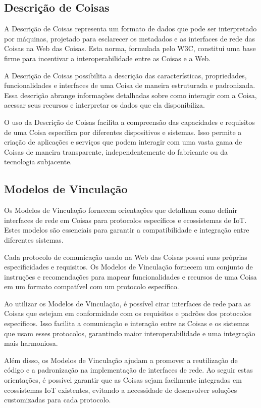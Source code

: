 \subsection{Descrição de Coisas}

A Descrição de Coisas representa um formato de dados que pode ser interpretado por máquinas, projetado para esclarecer os metadados e as interfaces de rede das Coisas na Web das Coisas. Esta norma, formulada pelo W3C, constitui uma base firme para incentivar a interoperabilidade entre as Coisas e a Web.

A Descrição de Coisas possibilita a descrição das características, propriedades, funcionalidades e interfaces de uma Coisa de maneira estruturada e padronizada. Essa descrição abrange informações detalhadas sobre como interagir com a Coisa, acessar seus recursos e interpretar os dados que ela disponibiliza.

O uso da Descrição de Coisas facilita a compreensão das capacidades e requisitos de uma Coisa específica por diferentes dispositivos e sistemas. Isso permite a criação de aplicações e serviços que podem interagir com uma vasta gama de Coisas de maneira transparente, independentemente do fabricante ou da tecnologia subjacente.

\subsection{Modelos de Vinculação}

Os Modelos de Vinculação fornecem orientações que detalham como definir interfaces de rede em Coisas para protocolos específicos e ecossistemas de IoT. Estes modelos são essenciais para garantir a compatibilidade e integração entre diferentes sistemas.

Cada protocolo de comunicação usado na Web das Coisas possui suas próprias especificidades e requisitos. Os Modelos de Vinculação fornecem um conjunto de instruções e recomendações para mapear funcionalidades e recursos de uma Coisa em um formato compatível com um protocolo específico.

Ao utilizar os Modelos de Vinculação, é possível cirar interfaces de rede para as Coisas que estejam em conformidade com os requisitos e padrões dos protocolos específicos. Isso facilita a comunicação e interação entre as Coisas e os sistemas que usam esses protocolos, garantindo maior interoperabilidade e uma integração mais harmoniosa.

Além disso, os Modelos de Vinculação ajudam a promover a reutilização de código e a padronização na implementação de interfaces de rede. Ao seguir estas orientações, é possível garantir que as Coisas sejam facilmente integradas em ecossistemas IoT existentes, evitando a necessidade de desenvolver soluções customizadas para cada protocolo.

